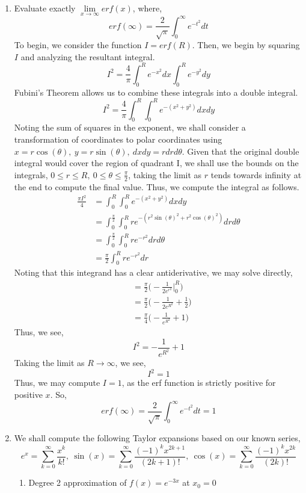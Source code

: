 \documentclass[letterpaper,10pt]{article}
\begin{document}
\begin{enumerate}
\item Evaluate exactly $\lim\limits_{x\to\infty}erf(x)$, where,
\[erf(\infty)=\frac{2}{\sqrt{\pi}}\int_{0}^{\infty}e^{-t^2}dt\]
To begin, we consider the function $I=erf(R)$. Then, we begin by squaring $I$ and analyzing the resultant integral.
\[I^2=\frac{4}{\pi}\int_{0}^{R}e^{-x^2}dx\int_{0}^{R}e^{-y^2}dy\]
Fubini's Theorem allows us to combine these integrals into a double integral.
\[I^2=\frac{4}{\pi}\int_{0}^{R}\int_{0}^{R}e^{-(x^2+y^2)}dxdy\]
Noting the sum of squares in the exponent, we shall consider a transformation of coordinates to polar coordinates using $x=r\cos(\theta),\ y=r\sin(\theta),\ dxdy=rdrd\theta$. Given that the original double integral would cover the region of quadrant I, we shall use the bounds on the integrals, $0\leq r\leq R,\ 0\leq \theta \leq \frac{\pi}{2}$, taking the limit as $r$ tends towards infinity at the end to compute the final value. Thus, we compute the integral as follows.
\begin{align*}
\frac{\pi I^2}{4}&=\int_{0}^{R}\int_{0}^{R}e^{-(x^2+y^2)}dxdy \\
&=\int_{0}^{\frac{\pi}{2}}\int_{0}^{R}re^{-(r^2\sin(\theta)^2+r^2\cos(\theta)^2)}drd\theta\\
&=\int_{0}^{\frac{\pi}{2}}\int_{0}^{R}re^{-r^2}drd\theta\\
&=\frac{\pi}{2}\int_{0}^{R}re^{-r^2}dr
\end{align*}
Noting that this integrand has a clear antiderivative, we may solve directly,
\begin{align*}
&=\frac{\pi}{2}\bigg(-\frac{1}{2e^{r^2}}\bigg|_0^R\bigg)\\
&=\frac{\pi}{2}\bigg(-\frac{1}{2e^{R^2}}+\frac{1}{2}\bigg)\\
&=\frac{\pi}{4}\bigg(-\frac{1}{e^{R^2}}+1\bigg)
\end{align*}
Thus, we see,
\[I^2=-\frac{1}{e^{R^2}}+1\]
Taking the limit as $R\to\infty$, we see,
\[I^2=1\]
Thus, we may compute $I=1$, as the erf function is strictly positive for positive $x$. So,
\[erf(\infty)=\frac{2}{\sqrt{\pi}}\int_{0}^{\infty}e^{-t^2}dt=1\]
\item We shall compute the following Taylor expansions based on our known series,
\[e^x=\sum_{k=0}^{\infty}\frac{x^k}{k!},\ \sin(x)=\sum_{k=0}^{\infty}\frac{(-1)^kx^{2k+1}}{(2k+1)!},\ \cos(x)=\sum_{k=0}^{\infty}\frac{(-1)^kx^{2k}}{(2k)!}\]
\begin{enumerate}
\item Degree 2 approximation of $f(x)=e^{-3x}$ at $x_0=0$\\

\end{enumerate}
\end{enumerate}
\end{document}
